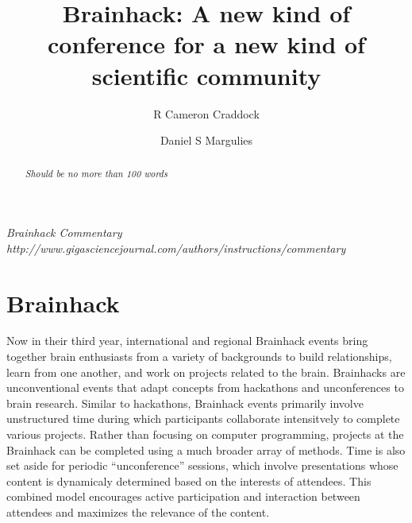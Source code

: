 \documentclass[11pt]{bmc_article_s50}
\begin{document}
\title{Brainhack: A new kind of conference for a new kind of scientific
community}

\maketitle

\author[1,2*]{R Cameron Craddock}\cor{}
\author[3]{Daniel S Margulies}


\address[1]{
  Computational Neuroimaging Lab, Center for Biomedical Imaging and
Neuromodulation, Nathan Kline Institute for Psychiatric Research%
  , 140 Old Orangeburg Rd%
  , 10962%
  , Orangeburg%
  , New York %
  , USA
}
\address[2]{
  Center for the Developing Brain, Child Mind Institute%
  , 445 Park Ave%
  , 10022%
  , New York%
  , New York %
  , USA
}
\address[3]{
  Max Planck Research Group for Neuroanatomy and Connectivity, Max Planck
Institute for Human Cognitive and Brain Sciences%
  , Stephaßnstraße 1A%
  , 4103%
  , Leipzig%
  , Germany
}


\begin{abstract}
\emph{Should be no more than 100 words}
\end{abstract}



\emph{Brainhack Commentary}
\emph{http://www.gigasciencejournal.com/authors/instructions/commentary}

\section{Brainhack}\label{brainhack}

Now in their third year, international and regional Brainhack events
bring together brain enthusiasts from a variety of backgrounds to build
relationships, learn from one another, and work on projects related to
the brain. Brainhacks are unconventional events that adapt concepts from
hackathons and unconferences to brain research. Similar to hackathons,
Brainhack events primarily involve unstructured time during which
participants collaborate intensitvely to complete various projects.
Rather than focusing on computer programming, projects at the Brainhack
can be completed using a much broader array of methods. Time is also set
aside for periodic ``unconference'' sessions, which involve
presentations whose content is dynamicaly determined based on the
interests of attendees. This combined model encourages active
participation and interaction between attendees and maximizes the
relevance of the content.
\end{document}
